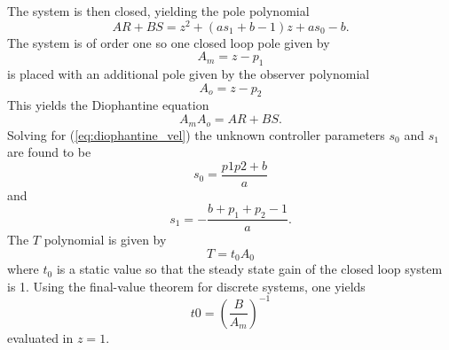 \documentclass[12pt,a4paper]{article}
\begin{document}
The system is then closed, yielding the pole polynomial
\begin{equation}
    \label{eq:polepolynomial_vel}
    AR + BS = z^2+(as_1+b-1)z+as_0-b.
\end{equation}
The system is of order one so one closed loop pole given by 
\begin{equation}
    \label{eq:am_vel}
    A_m = z - p_1
\end{equation}
is placed with an additional pole given by the observer polynomial 
\begin{equation}
    \label{eq:ao_vel}
    A_o = z - p_2
\end{equation}
This yields the Diophantine equation
\begin{equation}
    \label{eq:diophantine_vel}
    A_mA_o = AR + BS.
\end{equation}
Solving for (\ref{eq:diophantine_vel}) the unknown controller parameters $s_0$
and $s_1$ are found to be
\begin{equation}
    \label{eq:s0_vel}
    s_0 = \frac{p1p2+b}{a}
\end{equation}
and
\begin{equation}
    \label{eq:s1_vel}
    s_1 = -\frac{b + p_1 + p_2 -1}{a}.
\end{equation}
The $T$ polynomial is given by 
\begin{equation}
    \label{eq:T_vel}
    T = t_0A_0
\end{equation}
where $t_0$ is a static value so that the steady state gain of the closed loop
system is 1. Using the final-value theorem for discrete systems, one yields
\begin{equation}
    \label{eq:t0_vel}
    t0 = \left (\frac{B}{A_m} \right )^{-1}
\end{equation}
evaluated in $z=1$. 
\end{document}
